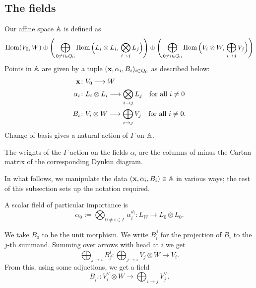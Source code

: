 \documentclass{amsart}
\theoremstyle{definition}
\begin{document}
\subsection{The fields}
Our affine space $\mathbb{A}$ is defined as
\begin{equation*}
    \operatorname{Hom}(V_0,W) \oplus \Bigg(\bigoplus_{0\neq i \in Q_0} \operatorname{Hom}\Big(L_i \otimes L_i,\, \bigotimes_{i \rightarrow j} L_j\Big) \Bigg) \oplus  \Bigg(\bigoplus_{0\neq i \in Q_0} \operatorname{Hom}\Big(V_i \otimes W,\, \bigoplus_{i \rightarrow j} V_j\Big) \Bigg)
\end{equation*}
Points in $\mathbb{A}$ are given by a tuple $(\mathbf{x},\alpha_i, B_i)_{i \in Q_0}$ as described below:
\begin{align}
\mathbf{x} \colon &V_0 \longrightarrow W \label{fd:x} \\
\alpha_i \colon &L_i \otimes L_i \longrightarrow \bigotimes_{i \rightarrow j} L_j \quad \text{for all} \,\, i\neq 0 \label{fd:alpha} \\
 B_i \colon &V_i \otimes W \longrightarrow \bigoplus_{i \rightarrow j} V_j \quad \text{for all} \,\, i\neq 0. \label{fd:B}
\end{align}
Change of basis gives a natural action of $\Gamma$ on $\mathbb{A}$.

\begin{remark}\label{rm:cartan}
The weights of the $\Gamma$-action on the fields $\alpha_i$ are the columns of minus the Cartan matrix of the corresponding Dynkin diagram.
\end{remark}

In what follows, we manipulate the data $(\mathbf{x}, \alpha_i, B_i) \in \mathbb{A}$ in various ways; the rest of this subsection sets up the notation required.

\begin{notation}
A scalar field of particular importance is $$\alpha_0:= \bigotimes_{0 \neq i \in I} \,\alpha_i^{d_i}: L_W \rightarrow L_0 \otimes L_0.$$
\end{notation}

\begin{notation}
We take $B_0$ to be the unit morphism.
We write $B_i^j$ for the projection of $B_i$ to the $j$-th summand. 
Summing over arrows with head at $i$ we get $$\bigoplus_{j \rightarrow i} B_j^i \colon \bigoplus_{j \rightarrow i} V_j \otimes W \longrightarrow V_i.$$
From this, using some adjuctions, we get a field $$B_{i^\vee} \colon V_i^\vee \otimes W \longrightarrow \bigoplus_{i \rightarrow j} V_j^\vee.$$
\end{notation}
\end{document}
